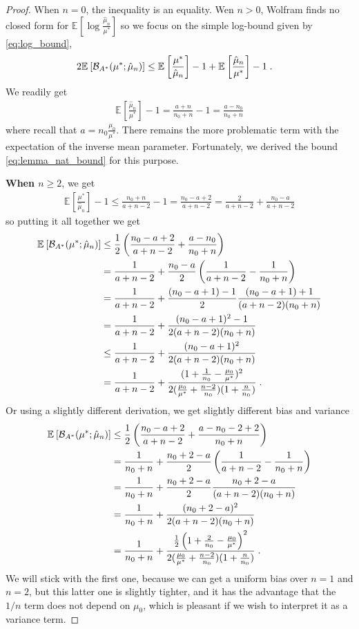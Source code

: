 \documentclass{article}
\newcommand*{\expect}[2][]{\ensuremath{\mathbb{E}_{#1} \left[ #2 \right] }} %
\newcommand{\logpart}{A}
\newcommand{\bregmanconj}{\cB_{\logpart^*}}
\newcommand{\MAPm}{\hat \mu_n}
\begin{document}
\begin{proof}
When $n=0$, the inequality is an equality. 
Wen $n>0$, Wolfram finds no closed form for $\expect{\log\frac{\MAPm}{\mu^*}}$ so we focus on the simple log-bound given by \eqref{eq:log_bound},
\begin{align}
	2\expect{\bregmanconj(\mu^*; \MAPm)} 
	&\leq \expect{\frac{\mu^*}{\MAPm}} -1  + \expect{\frac{\MAPm}{\mu^*}} - 1 \; .
\end{align}
We readily get 
\begin{align}
	 \expect{\frac{\MAPm}{\mu^*}} - 1 = \frac{a+n}{n_0+n} - 1 = \frac{a - n_0}{n_0+n}
\end{align}
where recall that $a=n_0\frac{\mu_0}{\mu^*}$. 
There remains the more problematic term with the expectation of the inverse mean parameter.
Fortunately, we derived the bound \eqref{eq:lemma_nat_bound} for this purpose.

\textbf{When $n\geq 2$}, we get 
\begin{align}
	\expect{\frac{\mu^*}{\MAPm}} - 1 
	\leq \frac{n_0 + n}{a +n - 2} -1
	= \frac{n_0 - a + 2}{a +n - 2}
	 = \frac{2}{a +n - 2} + \frac{n_0 - a}{a +n - 2}
\end{align}
so putting it all together we get 
\begin{align}
	\expect{\bregmanconj(\mu^*; \MAPm)} 
	&\leq \half \left(\frac{n_0 - a + 2}{a +n - 2}  + \frac{a - n_0}{n_0+n} \right )\\
	&= \frac{1}{a+n-2} + \frac{n_0-a}{2}  \left( \inv{a+n-2} - \inv{n_0+n} \right)\\
	&= \frac{1}{a+n-2} + \frac{(n_0-a + 1) - 1}{2}  \frac{(n_0 - a + 1) + 1}{(a+n-2)(n_0+n)} \\
	&= \frac{1}{a+n-2} + \frac{(n_0 - a +1)^2 - 1}{2(a+n-2)(n_0+n)} \\
	&\leq \frac{1}{a+n-2} + \frac{(n_0 - a +1)^2}{2(a+n-2)(n_0 + n)} \\
	&= \frac{1}{a+n-2} + \frac{(1 + \inv{n_0} - \frac{\mu_0}{\mu^*})^2}{2 (\frac{\mu_0}{\mu^*}+\frac{n-2}{n_0})(1 + \frac{n}{n_0} )} \; .
\end{align}
Or using a slightly different derivation, we get slightly different bias and variance
\begin{align}
	\expect{\bregmanconj(\mu^*; \MAPm)} 
	&\leq \half \left(\frac{n_0 - a + 2}{a +n - 2}  + \frac{a - n_0 -2 +2}{n_0+n} \right )\\
	&= \frac{1}{n_0 + n} + \frac{n_0+ 2 - a}{2}  \left( \inv{a+n-2} - \inv{n_0+n} \right)\\
	&= \frac{1}{n_0 + n} + \frac{n_0+ 2 - a}{2}  \frac{n_0 + 2 - a}{(a+n-2)(n_0+n)} \\
	&= \frac{1}{n_0 + n} + \frac{(n_0 + 2 - a)^2}{2(a+n-2)(n_0+n)} \\
	&= \frac{1}{n_0 + n} + \frac{\half \paren{1 + \frac{2}{n_0} - \frac{\mu_0}{\mu^*}}^2 }{2 (\frac{\mu_0}{\mu^*}+\frac{n-2}{n_0})(1 + \frac{n}{n_0} )} \; .
\end{align}
We will stick with the first one, because we can get a uniform bias over $n=1$ and $n=2$, but this latter one is slightly tighter, and it has the advantage that the $1/n$ term does not depend on $\mu_0$, which is pleasant if we wish to interpret it as a variance term.


\end{proof}
\end{document}
